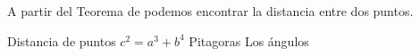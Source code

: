 
\question A partir del Teorema de \fillin \enspace podemos encontrar la
          distancia entre dos puntos.

  \begin{oneparchoices}
    \choice Distancia de puntos
    \choice $c^2 = a^3 + b^4$
    \CorrectChoice Pitagoras
    \choice Los ángulos
  \end{oneparchoices}
  \answerline[C]
